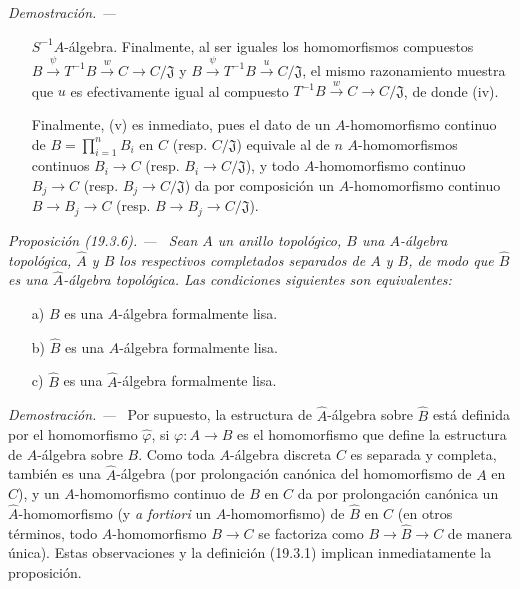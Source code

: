 \documentclass[10pt,oneside]{book}
\makeatletter
\newcommand{\setmanualcurrentlabel}[1]{\def\@currentlabel{#1}}
\newcommand{\oldpage}[2][]{%
  \setcounter{footnote}{0}%
  \marginpar{\scriptsize\textbf{#1}~|~#2}\ignorespaces}
\newenvironment{proposition}[1][]{%
  \setmanualcurrentlabel{#1}\par\medskip\noindent\itshape Proposición (#1). ---\ }{\par}
\newenvironment{proof}{%
  \par\medskip\noindent\textit{Demostración. ---\ }}{\par}
\makeatother
\begin{document}
\begin{proof}
\begin{enumerate}
  $S^{-1}A$-álgebra. Finalmente, al ser iguales los homomorfismos compuestos
  $B\xrightarrow{\psi}T^{-1}B\xrightarrow{w}C\to C/\mathfrak J$ y
  $B\xrightarrow{\psi}T^{-1}B\xrightarrow{u}C/\mathfrak J$, el mismo
  razonamiento muestra que $u$ es efectivamente igual al compuesto
  $T^{-1}B\xrightarrow{w}C\to C/\mathfrak J$, de donde (iv).
  \item[] Finalmente, (v) es inmediato, pues el dato de un $A$-homomorfismo
  continuo de $B=\prod_{i=1}^n B_i$ en $C$ (resp. $C/\mathfrak J$)
  equivale al de $n$ $A$-homomorfismos continuos $B_i\to C$
  (resp. $B_i\to C/\mathfrak J$), y todo $A$-homomorfismo continuo
  $B_j\to C$ (resp. $B_j\to C/\mathfrak J$) da por composición un
  $A$-homomorfismo continuo $B\to B_j\to C$
  (resp. $B\to B_j\to C/\mathfrak J$).
\end{enumerate}
\end{proof}

\oldpage[0\textsubscript{IV-1}]{83}

\begin{proposition}[19.3.6]
\label{0.19.3.6-es}
Sean $A$ un anillo topológico, $B$ una $A$-álgebra topológica, $\hat A$
y $\hat B$ los respectivos completados separados de $A$ y $B$, de modo que
$\hat B$ es una $\hat A$-álgebra topológica. Las condiciones siguientes
son equivalentes:
\begin{enumerate}
  \item[\textup{a)}] $B$ es una $A$-álgebra formalmente lisa.
  \item[\textup{b)}] $\hat B$ es una $A$-álgebra formalmente lisa.
  \item[\textup{c)}] $\hat B$ es una $\hat A$-álgebra formalmente lisa.
\end{enumerate}
\end{proposition}

\begin{proof}
Por supuesto, la estructura de $\hat A$-álgebra sobre $\hat B$ está definida
por el homomorfismo $\hat\varphi$, si $\varphi:A\to B$ es
el homomorfismo que define la estructura de $A$-álgebra sobre $B$. Como toda
$A$-álgebra discreta $C$ es separada y completa, también es una
$\hat A$-álgebra (por prolongación canónica del homomorfismo de $A$ en
$C$), y un $A$-homomorfismo continuo de $B$ en $C$ da por prolongación
canónica un $\hat A$-homomorfismo (y \emph{a fortiori} un
$A$-homomorfismo) de $\hat B$ en $C$ (en otros términos, todo
$A$-homomorfismo $B\to C$ se factoriza como $B\to\hat B\to C$ de manera
única). Estas observaciones y la definición (19.3.1) implican inmediatamente la
proposición.
\end{proof}
\end{document}
